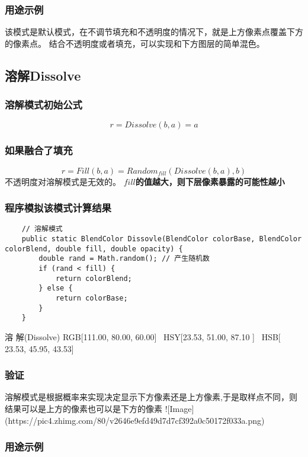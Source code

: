 \subsubsection{ 用途示例}

该模式是默认模式，在不调节填充和不透明度的情况下，就是上方像素点覆盖下方的像素点。
结合不透明度或者填充，可以实现和下方图层的简单混色。

\subsection{ 溶解Dissolve}

\subsubsection{ 溶解模式初始公式}

$$r=Dissolve(b,a)=a$$

\subsubsection{ 如果融合了填充}

$$r=Fill(b,a)= Random_{fill}(Dissolve(b,a),b)$$
不透明度对溶解模式是无效的。
\textbf{$fill$的值越大，则下层像素暴露的可能性越小}

\subsubsection{ 程序模拟该模式计算结果}

\begin{lstlisting}
	// 溶解模式
	public static BlendColor Dissovle(BlendColor colorBase, BlendColor colorBlend, double fill, double opacity) {
		double rand = Math.random(); // 产生随机数
		if (rand < fill) {
			return colorBlend;
		} else {
			return colorBase;
		}
	}
\end{lstlisting}

溶    解(Dissolve)      RGB[111.00,  80.00,  60.00]~ HSY[23.53,  51.00,  87.10 ]~ HSB[ 23.53,  45.95,  43.53]

\subsubsection{ 验证}
溶解模式是根据概率来实现决定显示下方像素还是上方像素,于是取样点不同，则结果可以是上方的像素也可以是下方的像素
![Image](https://pic4.zhimg.com/80/v2646e9efd49d7d7cf392a0c50172f033a.png)

\subsubsection{ 用途示例}


